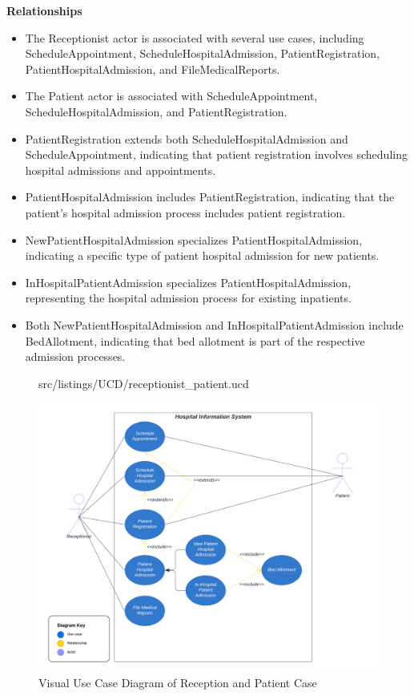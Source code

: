 \textbf{Relationships}
\begin{itemize}
    \item The Receptionist actor is associated with several use cases, including ScheduleAppointment, ScheduleHospitalAdmission, PatientRegistration, PatientHospitalAdmission, and FileMedicalReports.
    \item The Patient actor is associated with ScheduleAppointment, ScheduleHospitalAdmission, and PatientRegistration.
    \item PatientRegistration extends both ScheduleHospitalAdmission and ScheduleAppointment, indicating that patient registration involves scheduling hospital admissions and appointments.
    \item PatientHospitalAdmission includes PatientRegistration, indicating that the patient's hospital admission process includes patient registration.
    \item NewPatientHospitalAdmission specializes PatientHospitalAdmission, indicating a specific type of patient hospital admission for new patients.
    \item InHospitalPatientAdmission specializes PatientHospitalAdmission, representing the hospital admission process for existing inpatients.
    \item Both NewPatientHospitalAdmission and InHospitalPatientAdmission include BedAllotment, indicating that bed allotment is part of the respective admission processes.
\end{itemize}

\begin{figure}[!htb]
\lstset{language=MontiArc}
 {src/listings/UCD/receptionist_patient.ucd}
\end{figure}


\begin{figure}[!htb]
\begin{center}\includegraphics[width=12cm]{src/pic/Diagrams/Receptionist_Patient_UCD.png}\end{center}
\caption{Visual Use Case Diagram of Reception and Patient Case}
\label{RPUCD}
\end{figure}

